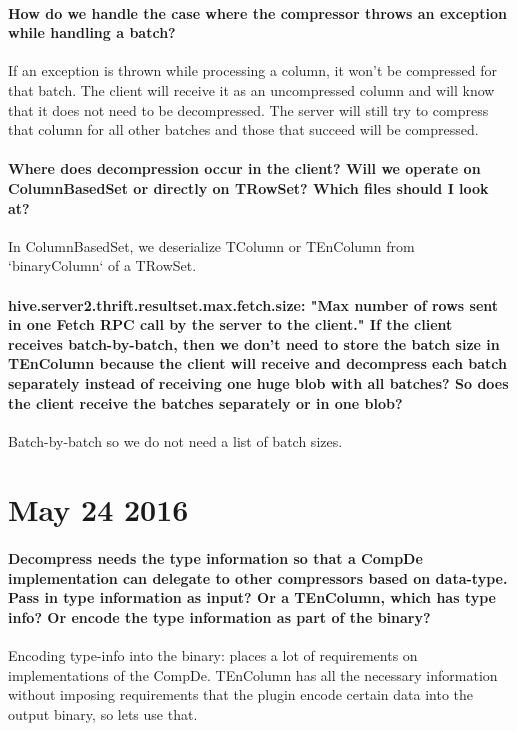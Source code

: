 \documentclass[11pt,a4paper]{article}
\begin{document}
	\paragraph{How do we handle the case where the compressor throws an exception while handling a batch?}
	If an exception is thrown while processing a column, it won't be compressed for that batch. The client will receive it as an uncompressed column and will know that it does not need to be decompressed. The server will still try to compress that column for all other batches and those that succeed will be compressed.
	
	\paragraph{Where does decompression occur in the client? Will we operate on ColumnBasedSet or directly on TRowSet? Which files should I look at?}
	In ColumnBasedSet, we deserialize TColumn or TEnColumn from `binaryColumn` of a TRowSet.
	
	\paragraph{hive.server2.thrift.resultset.max.fetch.size: "Max number of rows sent in one Fetch RPC call by the server to the client." If the client receives batch-by-batch, then we don't need to store the batch size in TEnColumn because the client will receive and decompress each batch separately instead of receiving one huge blob with all batches? So does the client receive the batches separately or in one blob?}
	Batch-by-batch so we do not need a list of batch sizes.
	
\section*{May 24 2016}
	
	\paragraph{Decompress needs the type information so that a CompDe implementation can delegate to other compressors based on data-type. Pass in type information as input? Or a TEnColumn, which has type info? Or encode the type information as part of the binary?}
	Encoding type-info into the binary: places a lot of requirements on implementations of the CompDe. TEnColumn has all the necessary information without imposing requirements that the plugin encode certain data into the output binary, so lets use that.
	
\end{document}

